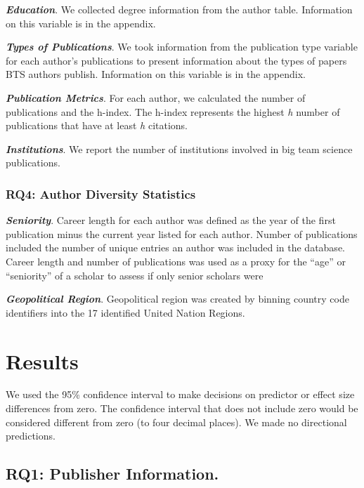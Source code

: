 \documentclass[
  man,floatsintext]{apa6}
\begin{document}
\textbf{\emph{Education}}. We collected degree information from the author table.
Information on this variable is in the appendix.

\textbf{\emph{Types of Publications}}. We took information from the publication
type variable for each author's publications to present information
about the types of papers BTS authors publish. Information on this
variable is in the appendix.

\textbf{\emph{Publication Metrics}}. For each author, we calculated the number of publications and the h-index. The h-index represents the highest \emph{h} number of publications that have at least \emph{h} citations.

\textbf{\emph{Institutions}}. We report the number of institutions involved in big team science publications.

\hypertarget{rq4-author-diversity-statistics}{%
\subsubsection{RQ4: Author Diversity Statistics ~}\label{rq4-author-diversity-statistics}}

\textbf{\emph{Seniority}}. Career length for each author was defined as the
year of the first publication minus the current year listed for each
author. Number of publications included the number of unique entries an author was included in the database. Career length and number of publications was used as a proxy for the ``age'' or ``seniority'' of a scholar to assess if only senior scholars were

\textbf{\emph{Geopolitical Region}}. Geopolitical region was created by binning country code identifiers into the 17 identified United Nation Regions.

\hypertarget{results}{%
\section{Results}\label{results}}

We used the 95\% confidence interval to make decisions on predictor or
effect size differences from zero. The confidence interval that does not
include zero would be considered different from zero (to four decimal
places). We made no directional predictions.

\hypertarget{rq1-publisher-information.}{%
\subsection{RQ1: Publisher Information.}\label{rq1-publisher-information.}}
\end{document}
